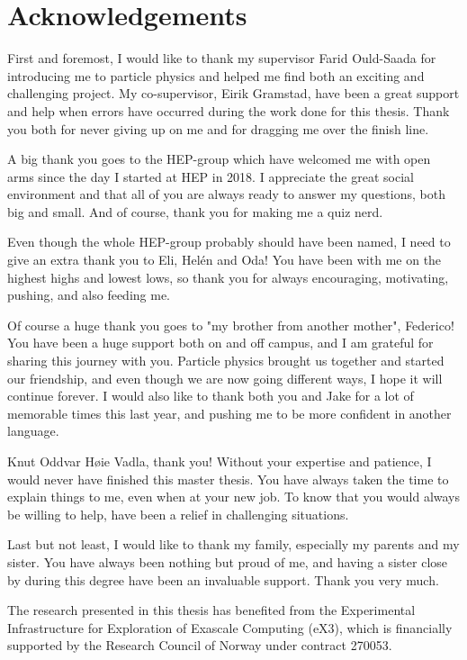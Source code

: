 \chapter*{Acknowledgements}
First and foremost, I would like to thank my supervisor Farid Ould-Saada for introducing me to particle physics and helped me find both an exciting and challenging project. My co-supervisor, Eirik Gramstad, have been a great support and help when errors have occurred during the work done for this thesis. Thank you both for never giving up on me and for dragging me over the finish line.

A big thank you goes to the HEP-group which have welcomed me with open arms since the day I started at HEP in 2018. I appreciate the great social environment and that all of you are always ready to answer my questions, both big and small. And of course, thank you for making me a quiz nerd.

Even though the whole HEP-group probably should have been named, I need to give an extra thank you to Eli, Helén and Oda! You have been with me on the highest highs and lowest lows, so thank you for always encouraging, motivating, pushing, and also feeding me. 

Of course a huge thank you goes to "my brother from another mother", Federico! You have been a huge support both on and off campus, and I am grateful for sharing this journey with you. Particle physics brought us together and started our friendship, and even though we are now going different ways, I hope it will continue forever. I would also like to thank both you and Jake for a lot of memorable times this last year, and pushing me to be more confident in another language.

Knut Oddvar Høie Vadla, thank you! Without your expertise and patience, I would never have finished this master thesis. You have always taken the time to explain things to me, even when at your new job. To know that you would always be willing to help, have been a relief in challenging situations. 

Last but not least, I would like to thank my family, especially my parents and my sister. You have always been nothing but proud of me, and having a sister close by during this degree have been an invaluable support. Thank you very much.

The research presented in this thesis has benefited from the Experimental Infrastructure for Exploration of Exascale Computing (eX3), which is financially supported by the Research Council of Norway under contract 270053.
